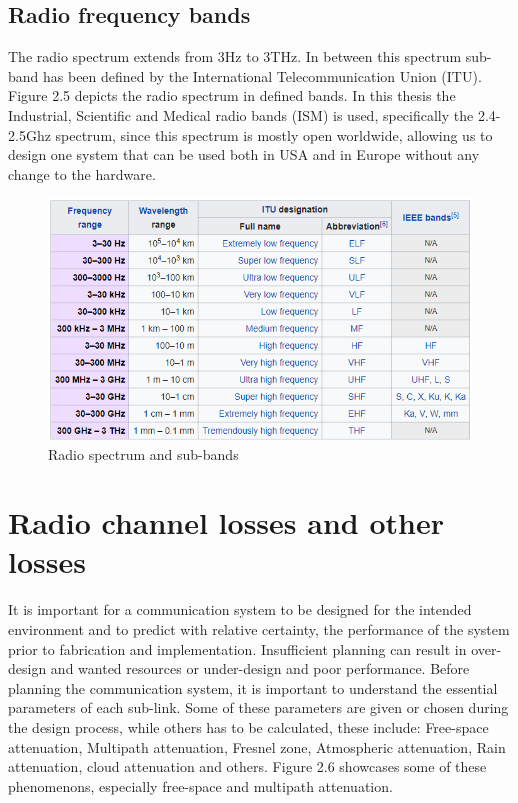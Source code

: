 \subsection{Radio frequency bands}
The radio spectrum extends from 3Hz to 3THz. In between this spectrum sub-band has been defined by the International Telecommunication Union (ITU)\cite{ITU}. Figure 2.5 depicts the radio spectrum in defined bands. In this thesis the Industrial, Scientific and Medical radio bands (ISM)\cite{ISM} is used, specifically the 2.4-2.5Ghz spectrum, since this spectrum is mostly open worldwide, allowing us to design one system that can be used both in USA and in Europe without any change to the hardware.   
\begin{figure}[h]
\centering
\includegraphics[scale=0.8]{figures/radioSpectrum.PNG}
\caption{Radio spectrum and sub-bands\cite{FrequencyBand}}
\end{figure}

\section{Radio channel losses and other losses}
It is important for a communication system to be designed for the intended environment and to predict with relative certainty, the performance of the system prior to fabrication and implementation. Insufficient planning can result in over-design and wanted resources or under-design and poor performance. Before planning the communication system, it is important to understand the essential parameters of each sub-link. Some of these parameters are given or chosen during the design process, while others has to be calculated, these include: Free-space attenuation, Multipath attenuation, Fresnel zone, Atmospheric attenuation, Rain attenuation, cloud attenuation and others. Figure 2.6 showcases some of these phenomenons, especially free-space and multipath attenuation. 

